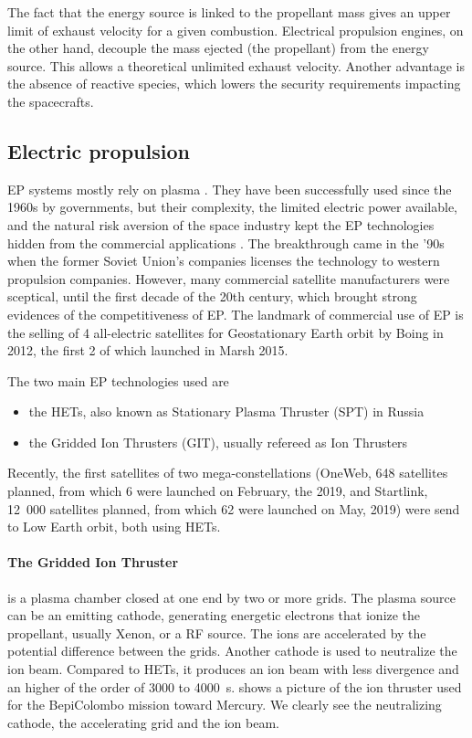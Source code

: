 The fact that the energy source is linked to the propellant mass gives an upper limit of exhaust velocity for a given combustion.
Electrical propulsion engines, on the other hand, decouple the mass ejected (the propellant) from the energy source.
This allows a theoretical unlimited exhaust velocity.
Another advantage is the absence of reactive species, which lowers the security requirements impacting the spacecrafts.

\subsection*{Electric propulsion} \label{subsec-label}
\ac{EP} systems mostly rely on plasma \citep{charles2009,mazouffre2016}.
They have been successfully used since the 1960s by governments, but their complexity, the limited electric power available, and the natural risk aversion of the space industry kept the \ac{EP} technologies hidden from the commercial applications \citep{lev2019}.
The breakthrough came in the '90s when the former Soviet Union's companies licenses the technology to western propulsion companies.
However, many commercial satellite manufacturers were sceptical, until the first decade of the 20th century, which brought strong evidences of the competitiveness of \ac{EP}.
The landmark of commercial use of \ac{EP} is the selling of 4 all-electric satellites for Geostationary Earth orbit by Boing in 2012, the first 2 of which launched in Marsh 2015.

The two main \ac{EP} technologies used are
\begin{itemize}
  \item the \ac{HET}s, also known as Stationary Plasma Thruster (SPT) in Russia
  \item the Gridded Ion Thrusters (GIT), usually refereed as Ion Thrusters
\end{itemize}

Recently, the first satellites of two mega-constellations (OneWeb, 648 satellites planned, from which 6 were launched on February, the  2019, and Startlink, 12~000 satellites planned, from which 62 were launched on May,  2019) were send to Low Earth orbit, both using \ac{HET}s. 


 
 \paragraph{The Gridded Ion Thruster} is a plasma chamber closed at one end by two or more grids.
 The plasma source can be an emitting cathode, generating energetic electrons that ionize the propellant, usually Xenon, or a \ac{RF} source.
 The ions are accelerated by the potential difference between the grids.
 Another cathode is used to neutralize the ion beam.
 Compared to \ac{HET}s, it produces an ion beam with less divergence and an higher \Isp of the order of 3000 to 4000~s.
  shows a picture of the ion thruster used for the BepiColombo mission toward Mercury.
 We clearly see the neutralizing cathode, the accelerating grid and the ion beam.
 
